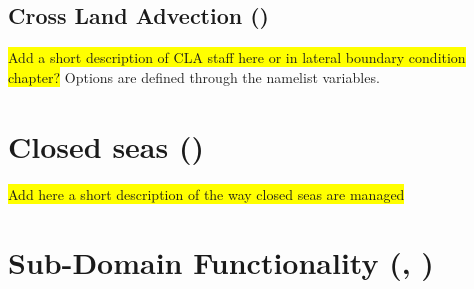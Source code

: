 \subsection{Cross Land Advection ()}
\label{MISC_strait_cla}

\colorbox{yellow}{Add a short description of CLA staff here or in lateral boundary condition chapter?}
Options are defined through the   namelist variables.


\section{Closed seas ()}
\label{MISC_closea}

\colorbox{yellow}{Add here a short description of the way closed seas are managed}


\section{Sub-Domain Functionality (, )}
\label{MISC_zoom}

